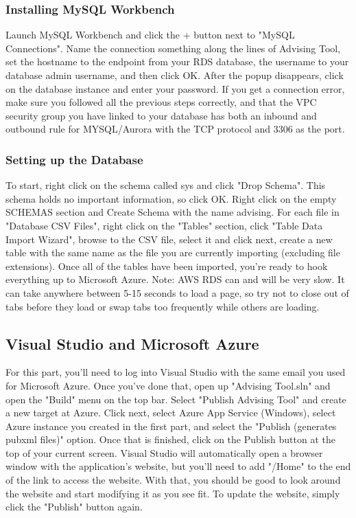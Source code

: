 \documentclass[12pt]{article}
\begin{document}
			\subsubsection{Installing MySQL Workbench}
				Launch MySQL Workbench and click the + button next to "MySQL Connections". Name the connection something along the lines of Advising Tool, set the hostname to the endpoint from your RDS database, the username to your database admin username, and then click OK. After the popup disappears, click on the database instance and enter your password. If you get a connection error, make sure you followed all the previous steps correctly, and that the VPC security group you have linked to your database has both an inbound and outbound rule for MYSQL/Aurora with the TCP protocol and 3306 as the port.
				
			\subsubsection{Setting up the Database}
				To start, right click on the schema called sys and click "Drop Schema". This schema holds no important information, so click OK. Right click on the empty SCHEMAS section and Create Schema with the name advising. For each file in "Database CSV Files", right click on the "Tables" section, click "Table Data Import Wizard", browse to the CSV file, select it and click next, create a new table with the same name as the file you are currently importing (excluding file extensions). Once all of the tables have been imported, you're ready to hook everything up to Microsoft Azure.					
				Note: AWS RDS can and will be very slow. It can take anywhere between 5-15 seconds to load a page, so try not to close out of tabs before they load or swap tabs too frequently while others are loading.
				
			\subsection{Visual Studio and Microsoft Azure}
				For this part, you'll need to log into Visual Studio with the same email you used for Microsoft Azure. Once you've done that, open up "Advising Tool.sln" and open the "Build" menu on the top bar. Select "Publish Advising Tool" and create a new target at Azure. Click next, select Azure App Service (Windows), select Azure instance you created in the first part, and select the "Publish (generates pubxml files)" option. Once that is finished, click on the Publish button at the top of your current screen. Visual Studio will automatically open a browser window with the application's website, but you'll need to add "/Home" to the end of the link to access the website. With that, you should be good to look around the website and start modifying it as you see fit. To update the website, simply click the "Publish" button again. 
				
\end{document}

